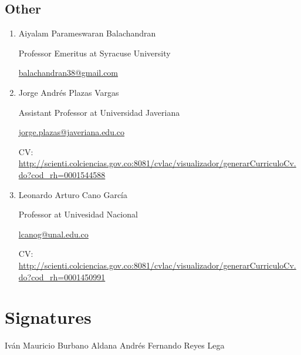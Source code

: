 \documentclass{article}
\begin{document}
\subsection*{Other}

\begin{enumerate}

\item Aiyalam Parameswaran Balachandran

Professor Emeritus at Syracuse University

\href{mailto:balachandran38@gmail.com}{balachandran38@gmail.com}

\item Jorge Andrés Plazas Vargas

Assistant Professor at Universidad Javeriana

\href{mailto:jorge.plazas@javeriana.edu.co}
{jorge.plazas@javeriana.edu.co}

CV: \url{http://scienti.colciencias.gov.co:8081/cvlac/visualizador/generarCurriculoCv.do?cod_rh=0001544588}

\item Leonardo Arturo Cano García 

Professor at Univesidad Nacional

\href{mailto:lcanog@unal.edu.co}{lcanog@unal.edu.co}

CV: \url{http://scienti.colciencias.gov.co:8081/cvlac/visualizador/generarCurriculoCv.do?cod_rh=0001450991}

\end{enumerate}

\section*{Signatures}

\vspace{2cm}

Iván Mauricio Burbano Aldana \hspace{2cm} Andrés Fernando Reyes Lega 



\end{document}
